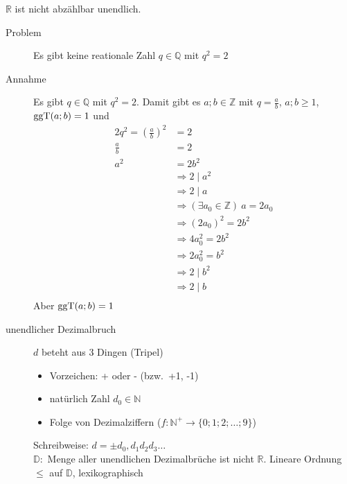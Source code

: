 $\mathbb{R}$ ist nicht abzählbar unendlich.
\begin{description}
    \item[Problem] Es gibt keine reationale Zahl $q \in \mathbb{Q}$ mit $q^2 = 2$
    \item[Annahme] Es gibt $q \in \mathbb{Q}$ mit $q^2 = 2$.
    Damit gibt es $a;b \in \mathbb{Z}$ mit $q = \frac{a}{b}$, $a;b \geq 1$, $\operatorname{ggT}(a;b) = 1$ und
    \begin{alignat*}{2}
        q^2 = \left( \frac{a}{b}\right)^2 & = 2                                                \\
        \frac{a}{b}                       & = 2                                                \\
        a^2                               & = 2b^2                                             \\
        & \Rightarrow 2 \mid a^2                             \\
        & \Rightarrow 2 \mid a                               \\
        & \Rightarrow (\exists a_0 \in \mathbb{Z})\ a = 2a_0 \\
        & \Rightarrow \left(2a_0\right)^2 = 2b^2             \\
        & \Rightarrow 4a_0^2 = 2b^2                          \\
        & \Rightarrow 2a_0^2 = b^2                           \\
        & \Rightarrow 2 \mid b^2                             \\
        & \Rightarrow 2 \mid b                               \\
    \end{alignat*}
    Aber $\operatorname{ggT}(a;b) = 1$
    \item[unendlicher Dezimalbruch] $d$ beteht aus 3 Dingen (Tripel)
    \begin{itemize}
        \item Vorzeichen: + oder - (bzw.\ +1, -1)
        \item natürlich Zahl $d_0 \in \mathbb{N}$
        \item Folge von Dezimalziffern ($f : \mathbb{N}^+ \longrightarrow \lbrace 0; 1; 2; \dots ; 9 \rbrace$)
    \end{itemize}
    Schreibweise: $d = \pm d_0,d_1 d_2 d_3\dots$\\
    $\mathbb{D} :$ Menge aller unendlichen Dezimalbrüche ist nicht $\mathbb{R}$.
    Lineare Ordnung $\leq$ auf $\mathbb{D}$, lexikographisch

\end{description}
